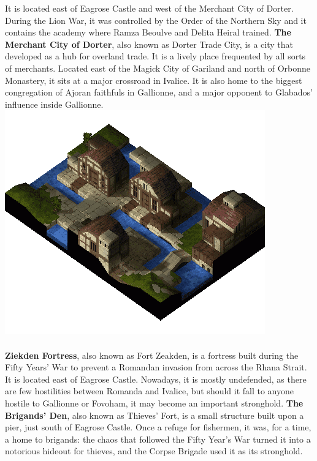 It is located east of Eagrose Castle and west of the Merchant City of Dorter. 
During the Lion War, it was controlled by the Order of the Northern Sky and it contains the academy where Ramza Beoulve and Delita Heiral trained.
\textbf{The Merchant City of Dorter}, also known as Dorter Trade City, is a city that developed as a hub for overland trade. 
It is a lively place frequented by all sorts of merchants. 
Located east of the Magick City of Gariland and north of Orbonne Monastery, it sits at a major crossroad in Ivalice. 
It is also home to the biggest congregation of Ajoran faithfuls in Gallionne, and a major opponent to Glabados' influence inside Gallionne.
%
\pagebreak\\
\includegraphics[width=\columnwidth]{./art/images/gariland.png}
\\\\
%
\textbf{Ziekden Fortress}, also known as Fort Zeakden, is a fortress built during the Fifty Years' War to prevent a Romandan invasion from across the Rhana Strait. 
It is located east of Eagrose Castle. 
Nowadays, it is mostly undefended, as there are few hostilities between Romanda and Ivalice, but should it fall to anyone hostile to Gallionne or Fovoham, it may become an important stronghold.
\textbf{The Brigands' Den}, also known as Thieves' Fort, is a small structure built upon a pier, just south of Eagrose Castle. 
Once a refuge for fishermen, it was, for a time, a home to brigands: the chaos that followed the Fifty Year's War turned it into a notorious hideout for thieves, and the Corpse Brigade used it as its stronghold. 
